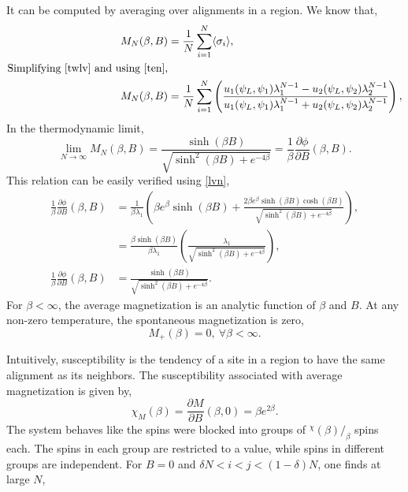 \documentclass[letterpaper,english,10pt]{article}
\begin{document}
\begin{defn} It can be computed by averaging over alignments in a region. 
We know that,
\begin{align}
M_{N}(\beta,B) &= \frac{1}{N}\sum_{i=1}^{N}\langle\sigma_{i}\rangle,\nonumber\\
\text{Simplifying \eqref{twlv} and using \eqref{ten}},\nonumber\\
M_{N}(\beta,B) &= \frac{1}{N} \sum_{i=1}^{N} \left(\frac{u_{1}(\psi_{L},\psi_{1})\lambda_{1}^{N-1}-u_{2}(\psi_{L},\psi_{2})\lambda_{2}^{N-1}}{u_{1}(\psi_{L},\psi_{1})\lambda_{1}^{N-1}+u_{2}(\psi_{L},\psi_{2})\lambda_{2}^{N-1}}\right),\nonumber
\end{align}
In the thermodynamic limit, 
\begin{equation}
\lim \limits_{N\rightarrow\infty}M_{N}(\beta,B) = \frac{\sinh (\beta B)}{\sqrt{\sinh^{2}(\beta B)+e^{-4\beta}}} = \frac{1}{\beta}\frac{\partial \phi}{\partial B}(\beta,B).
\end{equation}
This relation can be easily verified using \eqref{lvn},
\begin{align}
\frac{1}{\beta}\frac{\partial \phi}{\partial B}(\beta,B) &= \frac{1}{\beta \lambda_{1}}\left(\beta e^{\beta}\sinh(\beta B)+\frac{2\beta e^{\beta}\sinh(\beta B)\cosh(\beta B)}{\sqrt{\sinh^{2}(\beta B)+e^{-4\beta}}}\right),\nonumber\\
&= \frac{\beta \sinh(\beta B)}{\beta \lambda_{1}}\left(\frac{\lambda_{1}}{\sqrt{\sinh^{2}(\beta B)+e^{-4\beta}}}\right),\nonumber\\
\frac{1}{\beta}\frac{\partial \phi}{\partial B}(\beta,B) &=\frac{\sinh (\beta B)}{\sqrt{\sinh^{2}(\beta B)+e^{-4\beta}}}.\nonumber
\end{align}
For $\beta < \infty$, the average magnetization is an analytic function of $\beta$ and $B$. At any non-zero temperature, the spontaneous magnetization is zero,
$$M_{+}(\beta) = 0,~\forall \beta < \infty.$$

\begin{defn}[Susceptibility]
Intuitively, susceptibility is the tendency of a site in a region to have the same alignment as its neighbors. The susceptibility associated with average magnetization is given by,
\begin{equation}
\chi_{M}(\beta)=\frac{\partial M}{ \partial B}(\beta,0) = \beta e^{2\beta}.
\end{equation}
The system behaves like the spins were blocked into groups of $^\chi(\beta)/_\beta$ spins each. The spins in each group are restricted to a value, while spins in different groups are independent. For $B=0$ and $\delta N<i<j<(1-\delta)N$, one finds at large $N$, 


\end{defn}
\end{defn}
\end{document}
